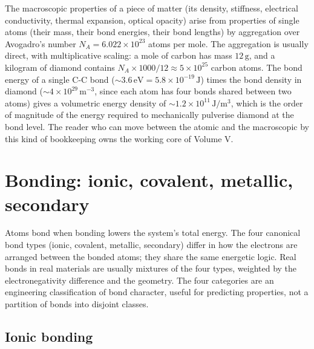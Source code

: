 \begin{archetype}
The macroscopic properties of a piece of matter (its density,
stiffness, electrical conductivity, thermal expansion, optical
opacity) arise from properties of single atoms (their mass, their
bond energies, their bond lengths) by aggregation over Avogadro's
number $N_A = 6.022 \times 10^{23}$ atoms per mole. The aggregation is
usually direct, with multiplicative scaling: a mole of carbon has mass
$12\,\text{g}$, and a kilogram of diamond contains $N_A \times 1000/12
\approx 5 \times 10^{25}$ carbon atoms. The bond energy of a single
C-C bond ($\sim 3.6\,\text{eV} = 5.8 \times 10^{-19}\,\text{J}$) times
the bond density in diamond ($\sim 4 \times 10^{29}\,\text{m}^{-3}$,
since each atom has four bonds shared between two atoms) gives a
volumetric energy density of $\sim 1.2 \times 10^{11}\,\text{J}/
\text{m}^3$, which is the order of magnitude of the energy required to
mechanically pulverise diamond at the bond level. The reader who can
move between the atomic and the macroscopic by this kind of bookkeeping
owns the working core of Volume V.
\end{archetype}

\section{Bonding: ionic, covalent, metallic, secondary}

Atoms bond when bonding lowers the system's total energy. The four
canonical bond types (ionic, covalent, metallic, secondary) differ in
how the electrons are arranged between the bonded atoms; they share
the same energetic logic. Real bonds in real materials are usually
mixtures of the four types, weighted by the electronegativity
difference and the geometry. The four categories are an engineering
classification of bond character, useful for predicting properties,
not a partition of bonds into disjoint classes.

\subsection{Ionic bonding}

